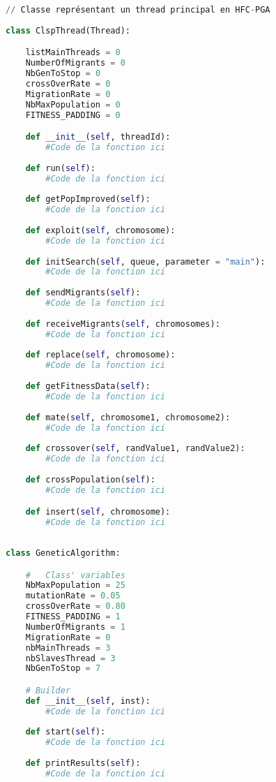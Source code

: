     \begin{lstlisting}[language=python]
    // Classe représentant un thread principal en HFC-PGA
    
class ClspThread(Thread):

	listMainThreads = 0
	NumberOfMigrants = 0
	NbGenToStop = 0
	crossOverRate = 0
	MigrationRate = 0
	NbMaxPopulation = 0
	FITNESS_PADDING = 0

	def __init__(self, threadId):
		#Code de la fonction ici	
	
	def run(self):
		#Code de la fonction ici	
	
	def getPopImproved(self):
		#Code de la fonction ici	
	
	def exploit(self, chromosome):
		#Code de la fonction ici	
	
	def initSearch(self, queue, parameter = "main"):
		#Code de la fonction ici	
	
	def sendMigrants(self):
		#Code de la fonction ici	
	
	def receiveMigrants(self, chromosomes):
		#Code de la fonction ici	
	
	def replace(self, chromosome):
		#Code de la fonction ici	
	
	def getFitnessData(self):
		#Code de la fonction ici	
	
	def mate(self, chromosome1, chromosome2):
		#Code de la fonction ici	
	
	def crossover(self, randValue1, randValue2):
		#Code de la fonction ici
	
	def crossPopulation(self):
		#Code de la fonction ici	

	def insert(self, chromosome):
		#Code de la fonction ici		
		
    \end{lstlisting}
    
    \begin{lstlisting}[language=python]
class GeneticAlgorithm:

	#	Class' variables
	NbMaxPopulation = 25
	mutationRate = 0.05
	crossOverRate = 0.80
	FITNESS_PADDING = 1
	NumberOfMigrants = 1
	MigrationRate = 0 
	nbMainThreads = 3
	nbSlavesThread = 3
	NbGenToStop = 7

	# Builder
	def __init__(self, inst):
		#Code de la fonction ici
	
	def start(self):
		#Code de la fonction ici
	
	def printResults(self):
		#Code de la fonction ici
		
    \end{lstlisting}
	
